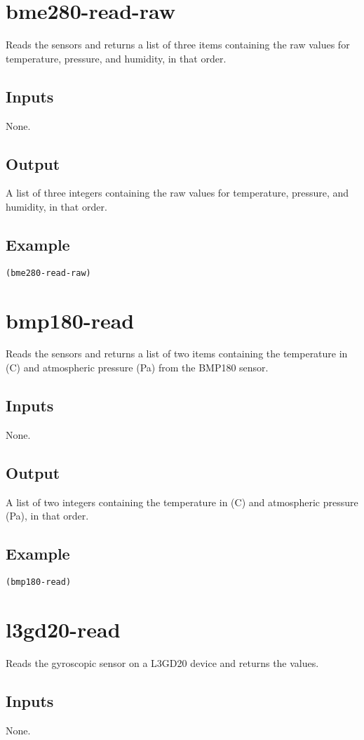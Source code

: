 \documentclass[10pt, openany]{book}
\begin{document}
\section{bme280-read-raw}
Reads the sensors and returns a list of three items containing the raw  values for temperature, pressure, and humidity, in that order.
\subsection{Inputs}
None.
\subsection{Output}
A list of three integers containing the raw values for temperature, pressure, and humidity, in that order.
\subsection{Example}
\begin{lstlisting}
(bme280-read-raw)
\end{lstlisting}

\section{bmp180-read}
Reads the sensors and returns a list of two items containing the temperature in (\degree{}C) and atmospheric pressure (Pa) from the BMP180 sensor.
\subsection{Inputs}
None.
\subsection{Output}
A list of two integers containing the temperature in (\degree{}C) and atmospheric pressure (Pa), in that order.
\subsection{Example}
\begin{lstlisting}
(bmp180-read)
\end{lstlisting}

\section{l3gd20-read}
Reads the gyroscopic sensor on a L3GD20 device and returns the values.
\subsection{Inputs}
None.
\end{document}

